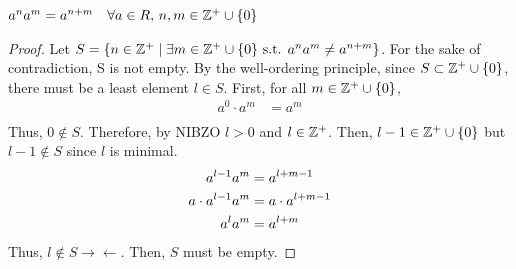 \begin{lemma}
    $a^na^m = a^{n+m} \quad \forall a \in R,\, n, m \in \mathbb{Z}^+ \cup \{0\}$
\end{lemma}
\begin{proof}
    Let $S= \left \{ n \in \mathbb{Z}^+ \mid \exists m \in \mathbb{Z}^+ \cup \{0\} \text{ s.t. } a^na^m \neq a^{n+m}\right \}$. For the sake of contradiction, S is not empty. By the well-ordering principle, since $S\subset \mathbb{Z}^+\cup\{0\}$, there must be a least element $l\in S$. First, for all $m \in \mathbb{Z}^+\cup\{0\}$, 
    \begin{align*}
        a^0 \cdot a^m &= a^m \\
    \end{align*}
    Thus, $0 \notin S$. Therefore, by NIBZO $l>0$ and $l \in \mathbb{Z}^+$. Then, $l-1\in\mathbb{Z}^+\cup\{0\}$ but $l-1 \notin S$ since $l$ is minimal.
    \begin{align*}
        a^{l-1} a^m &= a^{l+m-1}\\
        a \cdot a^{l-1} a^m &= a \cdot a^{l+m-1}\\
        a^la^m&=a^{l+m}
    \end{align*}
    Thus, $l \notin S \xrightarrow{}\xleftarrow{}$. Then, $S$ must be empty.
\end{proof}
